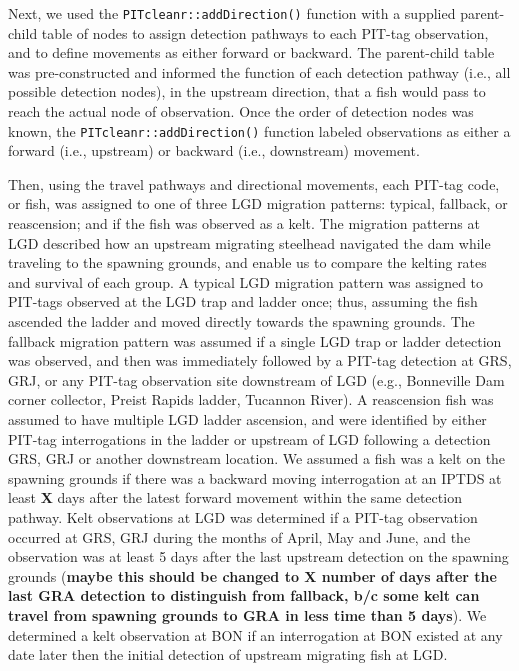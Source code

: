 \documentclass[11pt,a4paper,]{article}
\begin{document}
Next, we used the \texttt{PITcleanr::addDirection()} function with a supplied parent-child table of nodes to assign detection pathways to each PIT-tag observation, and to define movements as either forward or backward. The parent-child table was pre-constructed and informed the function of each detection pathway (i.e., all possible detection nodes), in the upstream direction, that a fish would pass to reach the actual node of observation. Once the order of detection nodes was known, the \texttt{PITcleanr::addDirection()} function labeled observations as either a forward (i.e., upstream) or backward (i.e., downstream) movement.

Then, using the travel pathways and directional movements, each PIT-tag code, or fish, was assigned to one of three LGD migration patterns: typical, fallback, or reascension; and if the fish was observed as a kelt. The migration patterns at LGD described how an upstream migrating steelhead navigated the dam while traveling to the spawning grounds, and enable us to compare the kelting rates and survival of each group. A typical LGD migration pattern was assigned to PIT-tags observed at the LGD trap and ladder once; thus, assuming the fish ascended the ladder and moved directly towards the spawning grounds. The fallback migration pattern was assumed if a single LGD trap or ladder detection was observed, and then was immediately followed by a PIT-tag detection at GRS, GRJ, or any PIT-tag observation site downstream of LGD (e.g., Bonneville Dam corner collector, Preist Rapids ladder, Tucannon River). A reascension fish was assumed to have multiple LGD ladder ascension, and were identified by either PIT-tag interrogations in the ladder or upstream of LGD following a detection GRS, GRJ or another downstream location. We assumed a fish was a kelt on the spawning grounds if there was a backward moving interrogation at an IPTDS at least \textbf{X} days after the latest forward movement within the same detection pathway. Kelt observations at LGD was determined if a PIT-tag observation occurred at GRS, GRJ during the months of April, May and June, and the observation was at least 5 days after the last upstream detection on the spawning grounds (\textbf{maybe this should be changed to X number of days after the last GRA detection to distinguish from fallback, b/c some kelt can travel from spawning grounds to GRA in less time than 5 days}). We determined a kelt observation at BON if an interrogation at BON existed at any date later then the initial detection of upstream migrating fish at LGD.
\end{document}
